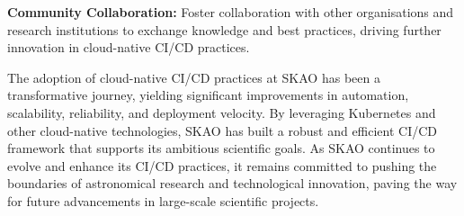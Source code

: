 \documentclass[a4paper]{spie}  %
\begin{document}
\textbf{Community Collaboration:} Foster collaboration with other organisations and research institutions to exchange knowledge and best practices, driving further innovation in cloud-native CI/CD practices.

The adoption of cloud-native CI/CD practices at SKAO has been a transformative journey, yielding significant improvements in automation, scalability, reliability, and deployment velocity. By leveraging Kubernetes and other cloud-native technologies, SKAO has built a robust and efficient CI/CD framework that supports its ambitious scientific goals. As SKAO continues to evolve and enhance its CI/CD practices, it remains committed to pushing the boundaries of astronomical research and technological innovation, paving the way for future advancements in large-scale scientific projects.

\end{document}
